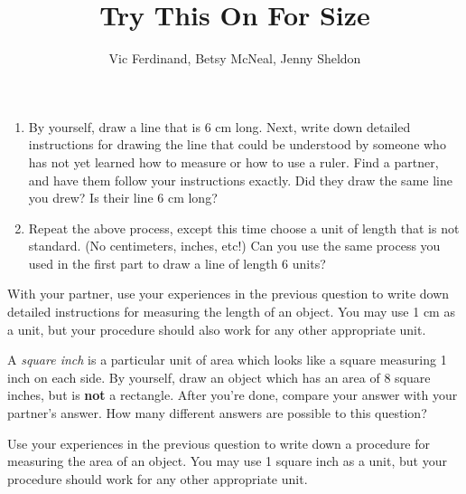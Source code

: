 \documentclass[nooutcomes]{ximera}
\title{Try This On For Size}
\author{Vic Ferdinand, Betsy McNeal, Jenny Sheldon}
\begin{document}
\begin{abstract}
\end{abstract}
\maketitle




\begin{problem} \label{Size1}
\hfill
\begin{enumerate}
\item By yourself, draw a line that is 6 cm long.  Next, write down detailed instructions for drawing the line that could be understood by someone who has not yet learned how to measure or how to use a ruler.  Find a partner, and have them follow your instructions exactly.  Did they draw the same line you drew?  Is their line 6 cm long?  
\item Repeat the above process, except this time choose a unit of length that is not standard.  (No centimeters, inches, etc!)  Can you use the same process you used in the first part to draw a line of length 6 units?
\end{enumerate}

\end{problem}



\begin{problem}
With your partner, use your experiences in the previous question to write down detailed instructions for measuring the length of an object.  You may use 1 cm as a unit, but your procedure should also work for any other appropriate unit.
\end{problem}





\begin{problem} \label{Size3}
A {\it square inch} is a particular unit of area which looks like a square measuring 1 inch on each side.  By yourself, draw an object which has an area of 8 square inches, but is {\bf not} a rectangle.  After you're done, compare your answer with your partner's answer.  How many different answers are possible to this question?
\end{problem}





\begin{problem}
Use your experiences in the previous question to write down a procedure for measuring the area of an object.  You may use 1 square inch as a unit, but your procedure should work for any other appropriate unit.  
\end{problem}
\end{document}
